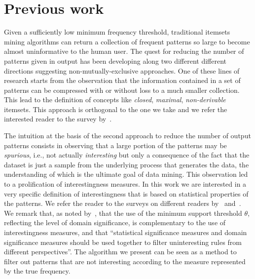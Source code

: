 \section{Previous work}\label{sec:prevwork}
Given a sufficiently low minimum frequency threshold, traditional itemsets
mining algorithms can return a collection of frequent patterns so large to
become almost uninformative to the human user. The quest for reducing the number
of patterns given in output has been developing along two different different
directions suggesting non-mutually-exclusive approaches. One of these lines of
research starts from the observation that the information contained in a
set of patterns can be compressed with or without loss to a much smaller
collection. This lead to the definition of concepts like \emph{closed},
\emph{maximal}, \emph{non-derivable} itemsets. This approach is orthogonal to
the one we take and we refer the interested reader to the survey by~\citet{CaldersRB06}.

The intuition at the basis of the second approach to reduce the number of output
patterns consists in
observing that a large portion of the patterns may be \emph{spurious}, i.e., not
actually \emph{interesting} but only a consequence of the fact that the dataset
is just a sample from the underlying process that generates the data, the
understanding of which is the ultimate goal of data mining. This observation led
to a prolification of interestingness measures. In this work we are interested
in a very specific definition of interestingness that is based on statistical
properties of the patterns. We refer the reader to the surveys on different
readers by~\citet[Sect.~3]{HanCXY07} and~\citet{GengH06}. %
We remark that, as noted by~\citet{LiuZW11}, that the use of the minimum
support threshold $\theta$, reflecting the level of domain significance, is complementary to the
use of interestingness measures, and that ``statistical significance measures and domain significance
measures should be used together to filter uninteresting rules from different
perspectives''. The algorithm we present can be seen as a method to filter out
patterns that are not interesting according to the measure represented by the
true frequency.

